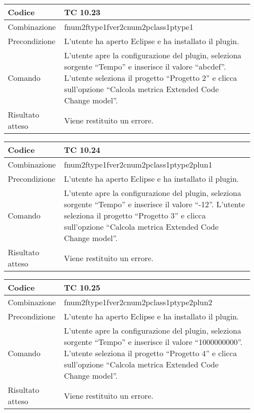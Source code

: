 \begin{table}[ht]
\begin{tabular}{|p{3cm}|p{9cm}|}
\hline
\cellcolor{lightgray}Codice				& TC 10.23								\\
\hline
\cellcolor{lightgray}Combinazione		& fnum2ftype1fver2cnum2pclass1ptype1									\\
\hline
\cellcolor{lightgray}Precondizione		& L'utente ha aperto Eclipse e ha installato il plugin.		\\
\hline
\cellcolor{lightgray}Comando			& L'utente apre la configurazione del plugin, seleziona sorgente ``Tempo'' e inserisce il valore ``abcdef''. L'utente seleziona il progetto ``Progetto 2''  e clicca sull'opzione ``Calcola metrica Extended Code Change model''.	\\
\hline
\cellcolor{lightgray}Risultato atteso	& Viene restituito un errore.\\
\hline
\end{tabular}
\end{table}

\clearpage

\begin{table}[ht]
\begin{tabular}{|p{3cm}|p{9cm}|}
\hline
\cellcolor{lightgray}Codice				& TC 10.24								\\
\hline
\cellcolor{lightgray}Combinazione		& fnum2ftype1fver2cnum2pclass1ptype2plun1									\\
\hline
\cellcolor{lightgray}Precondizione		& L'utente ha aperto Eclipse e ha installato il plugin.		\\
\hline
\cellcolor{lightgray}Comando			& L'utente apre la configurazione del plugin, seleziona sorgente ``Tempo'' e inserisce il valore ``-12''. L'utente seleziona il progetto ``Progetto 3''  e clicca sull'opzione ``Calcola metrica Extended Code Change model''.	\\
\hline
\cellcolor{lightgray}Risultato atteso	& Viene restituito un errore.\\
\hline
\end{tabular}
\end{table}

\begin{table}[ht]
\begin{tabular}{|p{3cm}|p{9cm}|}
\hline
\cellcolor{lightgray}Codice				& TC 10.25								\\
\hline
\cellcolor{lightgray}Combinazione		& fnum2ftype1fver2cnum2pclass1ptype2plun2									\\
\hline
\cellcolor{lightgray}Precondizione		& L'utente ha aperto Eclipse e ha installato il plugin.		\\
\hline
\cellcolor{lightgray}Comando			& L'utente apre la configurazione del plugin, seleziona sorgente ``Tempo'' e inserisce il valore ``1000000000''. L'utente seleziona il progetto ``Progetto 4''  e clicca sull'opzione ``Calcola metrica Extended Code Change model''.	\\
\hline
\cellcolor{lightgray}Risultato atteso	& Viene restituito un errore.\\
\hline
\end{tabular}
\end{table}

